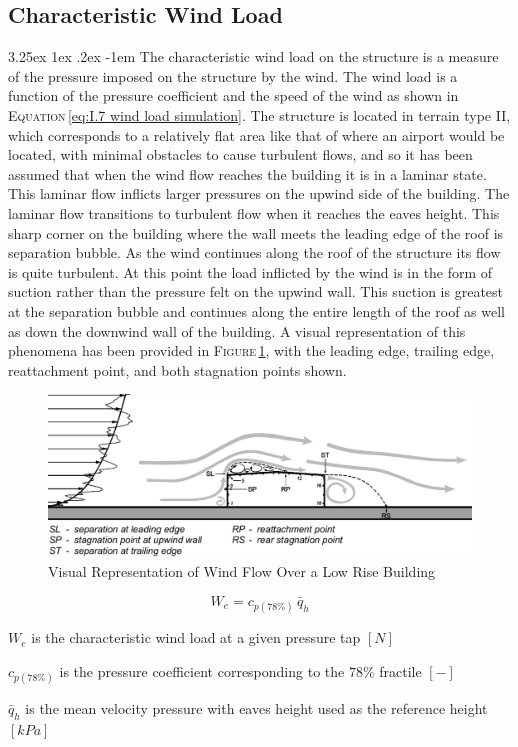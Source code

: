 \documentclass[11pt,a4paper,titlepage]{report}
\makeatletter
\renewcommand\paragraph{\@startsection{paragraph}{5}{\z@}%
  {3.25ex \@plus1ex \@minus.2ex}%
  {-1em}%
  {\normalfont\normalsize\bfseries}}
\makeatother
\begin{document}
\subsection{Characteristic Wind Load}
\paragraph{}The characteristic wind load on the structure is a measure of the pressure imposed on the structure by the wind. The wind load is a function of the pressure coefficient and the speed of the wind as shown in \textsc{Equation}\,\eqref{eq:I.7 wind load simulation}. The structure is located in terrain type II, which corresponds to a relatively flat area like that of where an airport would be located, with minimal obstacles to cause turbulent flows, and so it has been assumed that when the wind flow reaches the building it is in a laminar state. This laminar flow inflicts larger pressures on the upwind side of the building. The laminar flow transitions to turbulent flow when it reaches the eaves height. This sharp corner on the building where the wall meets the leading edge of the roof is separation bubble. As the wind continues along the roof of the structure its flow is quite turbulent. At this point the load inflicted by the wind is in the form of suction rather than the pressure felt on the upwind wall. This suction is greatest at the separation bubble and continues along the entire length of the roof as well as down the downwind wall of the building. A visual representation of this phenomena has been provided in \textsc{Figure}\,\ref{fig:wind flow description}, with the leading edge, trailing edge, reattachment point, and both stagnation points shown.
\begin{figure}
    \centering
    \includegraphics[width=16cm]{Wind_Flow_Description.jpeg}
    \caption{Visual Representation of Wind Flow Over a Low Rise Building}
    \label{fig:wind flow description}
\end{figure}
\begin{equation}
    W_e=c_{p(78\%)}\,\bar{q}_h
    \label{eq:I.7 wind load simulation}
\end{equation}
\begin{itemize}
\begin{small}
    \item $W_e$ is the characteristic wind load at a given pressure tap $[N]$
    \item $c_{p(78\%)}$ is the pressure coefficient corresponding to the $78\%$ fractile $[-]$
    \item $\bar{q}_h$ is the mean velocity pressure with eaves height used as the reference height $[kPa]$
\end{small}
\end{itemize}
\end{document}
